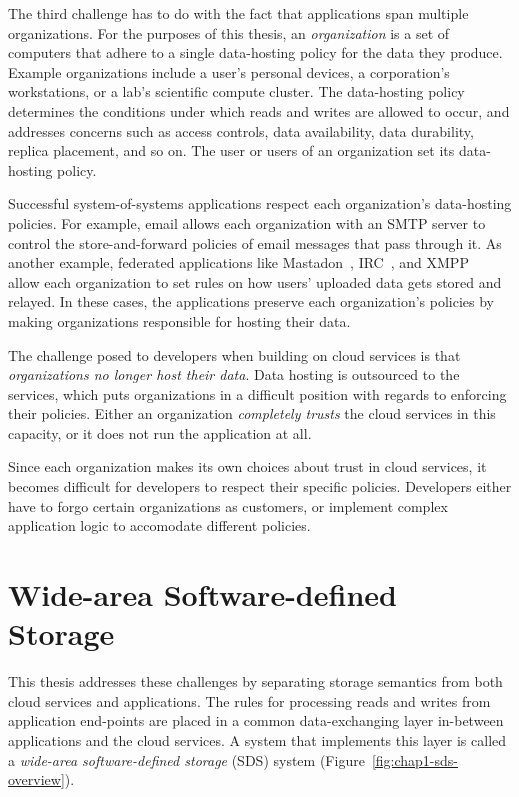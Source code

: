The third challenge has to do with the fact that applications span multiple
organizations.  For the purposes of this thesis, an \emph{organization} is a set of computers that
adhere to a single data-hosting policy for the data they produce.  Example organizations
include a user's personal devices, a corporation's workstations, or a lab's scientific
compute cluster.  The data-hosting policy determines the conditions under which
reads and writes are allowed to occur, and addresses concerns such as access
controls, data availability, data durability, replica placement, and so on.
The user or users of an organization set its data-hosting policy.

Successful system-of-systems applications respect each organization's
data-hosting policies.  For example, email allows each
organization with an SMTP server to control the store-and-forward policies
of email messages that pass through it.  As another example, federated applications
like Mastadon~\cite{mastadon}, IRC~\cite{irc}, and XMPP~\cite{xmpp} allow each
organization to set rules on how users' uploaded data gets stored and relayed.
In these cases, the applications preserve each organization's policies
by making organizations responsible for hosting their data.

The challenge posed to developers when building on cloud services is that
\emph{organizations no longer host their data}.  Data hosting is outsourced
to the services, which puts organizations in a difficult position with
regards to enforcing their policies.  Either an organization \emph{completely trusts} the
cloud services in this capacity, or it does not run the
application at all.

Since each organization makes its own choices about trust in cloud services,
it becomes difficult for developers to respect their specific policies.
Developers either have to forgo certain organizations
as customers, or implement complex application logic to accomodate different
policies.

\section{Wide-area Software-defined Storage}

This thesis addresses these challenges by separating storage semantics from both
cloud services and applications.  The rules for processing reads and writes
from application end-points are placed in a common data-exchanging
layer in-between applications and the cloud services.  A system that
implements this layer is called a \emph{wide-area software-defined storage} (SDS) system
(Figure~\ref{fig:chap1-sds-overview}).

